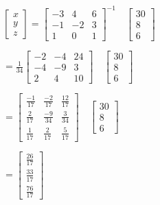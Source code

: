 \documentclass[a4paper,12pt]{article}
\begin{document}
\begin{enumerate}
     $
     \begin{bmatrix}
        x \\
        y \\
        z
     \end{bmatrix}
     =\begin{bmatrix}
        -3 & 4 & 6 \\
        -1 & -2 & 3 \\
        1 & 0 & 1
     \end{bmatrix}^{-1}
     \quad
     \begin{bmatrix}
        30 \\
        8 \\
        6
     \end{bmatrix}
     $

     $
     =\frac{1}{34}\begin{bmatrix}
        -2 & -4 & 24 \\
        -4 & -9 & 3 \\
        2 & 4 & 10
     \end{bmatrix}
     \quad
     \begin{bmatrix}
        30 \\
        8 \\
        6
     \end{bmatrix}
     $

     $
     =\begin{bmatrix}
        \frac{-1}{17} & \frac{-2}{17} & \frac{12}{17} \\[6pt] 
        \frac{2}{17} & \frac{-9}{34} & \frac{3}{34} \\[6pt] 
        \frac{1}{17} & \frac{2}{17} & \frac{5}{17}
     \end{bmatrix}
     \quad
     \begin{bmatrix}
        30 \\
        8 \\
        6
     \end{bmatrix}
     $

     $
     =\begin{bmatrix}
        \frac{26}{17} \\[6pt]
        \frac{33}{17} \\[6pt]
        \frac{76}{17}
     \end{bmatrix}
     $
   \end{enumerate}
\end{document}
